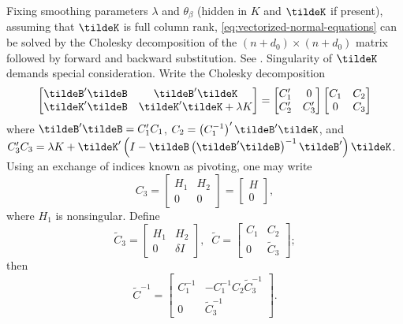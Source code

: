 Fixing smoothing parameters $\lambda$ and $\theta_\beta$ (hidden in $K$ and $\tildeK$ if present), assuming that $\tildeK$ is full column rank, \ref{eq:vectorized-normal-equations} can be solved by the Cholesky decomposition of the $\left( n + d_0 \right) \times \left( n + d_0 \right)$ matrix followed by forward and backward substitution. See \cite{golub2012matrix}. Singularity of $\tildeK$ demands special consideration. Write the Cholesky decomposition
\begin{equation} \label{eq:normal-equation-cholesky}
\begin{bmatrix}
\tildeB'\tildeB & \tildeB'\tildeK \\
\tildeK'\tildeB & \tildeK'\tildeK + \lambda K\\
\end{bmatrix}
= \begin{bmatrix}
C'_1 & 0 \\
C'_2  & C'_3 
\end{bmatrix}
\begin{bmatrix}
C_1 & C_2 \\
0  & C_3 
\end{bmatrix}
\end{equation}
\noindent
where $\tildeB'\tildeB = C'_1 C_1$, $C_2 = \left(C_1^{-1}\right)' \tildeB' \tildeK$, and $C'_3 C_3 = \lambda K +  \tildeK'\left( I - \tildeB\left( \tildeB' \tildeB \right)^{-1} \tildeB' \right)\tildeK$. Using an exchange of indices known as pivoting, one may write 
\begin{equation*}
C_3 = \begin{bmatrix} H_1 & H_2 \\ 0 & 0 \end{bmatrix} = \begin{bmatrix} H \\  0 \end{bmatrix},
\end{equation*}
\noindent
where $H_1$ is nonsingular. Define
\begin{equation} \label{eq:cholesky-factor-mod}
\tilde{C}_3 = \begin{bmatrix}
H_1 & H_2 \\
0  & \delta I 
\end{bmatrix}, \;\;
\tilde{C} = \begin{bmatrix}
C_1 & C_2 \\
0  & \tilde{C}_3 
\end{bmatrix};
\end{equation}
\noindent
then
\begin{equation} \label{eq:cholesky-factor-mod-inverse}
\tilde{C}^{-1} = \begin{bmatrix}
C_1^{-1} & -C_1^{-1} C_2 \tilde{C}_3^{-1} \\
0  & \tilde{C}_3^{-1}
\end{bmatrix}.
\end{equation}

